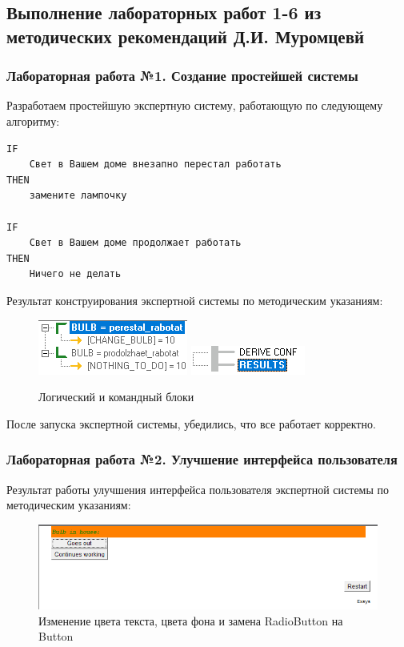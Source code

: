 \documentclass[14pt,a4paper,report]{report}
\begin{document}
\subsection{Выполнение лабораторных работ 1-6 из методических рекомендаций Д.И. Муромцевй}

\subsubsection{Лабораторная работа №1. Создание простейшей системы}

Разработаем простейшую экспертную систему, работающую по следующему алгоритму:

\begin{lstlisting}
IF
    Свет в Вашем доме внезапно перестал работать
THEN
    замените лампочку

IF
    Свет в Вашем доме продолжает работать
THEN
    Ничего не делать
\end{lstlisting}

Результат конструирования экспертной системы по методическим указаниям:

\begin{figure}[ht!]
	\includegraphics[width=.35\textwidth]{images/1_1.png}\hfill
	\includegraphics[width=.55\textwidth]{images/1_2.png}
	\caption{Логический и командный блоки}
\end{figure}

После запуска экспертной системы, убедились, что все работает корректно.

\subsubsection{Лабораторная работа №2. Улучшение интерфейса пользователя}

Результат работы улучшения интерфейса пользователя экспертной системы по методическим указаниям:

\begin{figure}[h!]
	\centering
	\includegraphics[scale = 0.70]{images/2_1.png}
	\caption{Изменение цвета текста, цвета фона и замена RadioButton на Button}
\end{figure}
\end{document}
